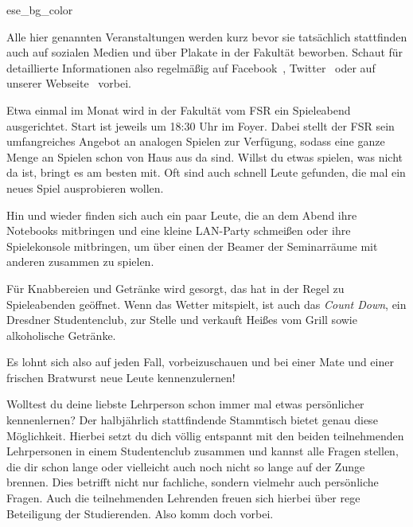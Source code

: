 
\begin{awesomeblock}{2pt}{\faInfoCircle}{ese_bg_color}
    \begin{minipage}[t]{.82\textwidth}
        Alle hier genannten Veranstaltungen werden kurz bevor sie tatsächlich stattfinden auch auf sozialen Medien und über Plakate in der Fakultät beworben. Schaut für detaillierte Informationen also regelmäßig auf Facebook~, Twitter~ oder auf unserer Webseite~ vorbei.
    \end{minipage}
\end{awesomeblock}


Etwa einmal im Monat wird in der Fakultät vom FSR ein Spieleabend ausgerichtet. Start ist jeweils um 18:30 Uhr im Foyer. Dabei stellt der FSR sein umfangreiches Angebot an analogen Spielen zur Verfügung, sodass eine ganze Menge an Spielen schon von Haus aus da sind. Willst du etwas spielen, was nicht da ist, bringt es am besten mit. Oft sind auch schnell Leute gefunden, die mal ein neues Spiel ausprobieren wollen.

Hin und wieder finden sich auch ein paar Leute, die an dem Abend ihre Notebooks mitbringen und eine kleine LAN-Party schmeißen oder ihre Spielekonsole mitbringen, um über einen der Beamer der Seminarräume mit anderen zusammen zu spielen.

Für Knabbereien und Getränke wird gesorgt, das \ascii{} hat in der Regel zu Spieleabenden geöffnet. Wenn das Wetter mitspielt, ist auch das \emph{Count Down}, ein Dresdner Studentenclub, zur Stelle und verkauft Heißes vom Grill sowie alkoholische Getränke.

Es lohnt sich also auf jeden Fall, vorbeizuschauen und bei einer Mate und einer frischen Bratwurst neue Leute kennenzulernen!


Wolltest du deine liebste Lehrperson schon immer mal etwas persönlicher kennenlernen? Der halbjährlich stattfindende Stammtisch bietet genau diese Möglichkeit. Hierbei setzt du dich völlig entspannt mit den beiden teilnehmenden Lehrpersonen in einem Studentenclub zusammen und kannst alle Fragen stellen, die dir schon lange oder vielleicht auch noch nicht so lange auf der Zunge brennen. Dies betrifft nicht nur fachliche, sondern vielmehr auch persönliche Fragen. Auch die teilnehmenden Lehrenden freuen sich hierbei über rege Beteiligung der Studierenden. Also komm doch vorbei.

